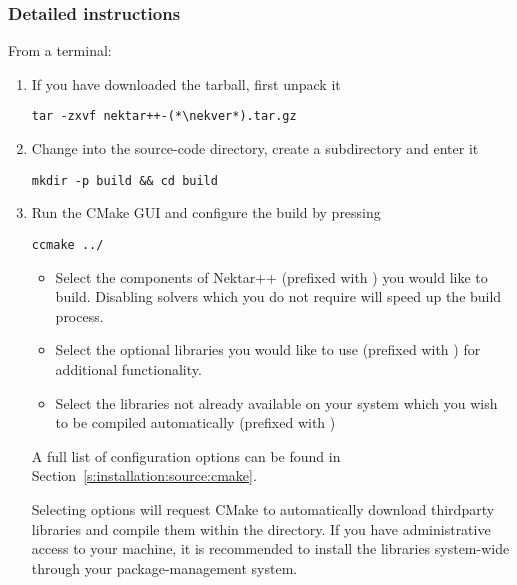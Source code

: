 \subsubsection{Detailed instructions}
From a terminal:
\begin{enumerate}
    \item If you have downloaded the tarball, first unpack it
    \begin{lstlisting}[style=BashInputStyle]
tar -zxvf nektar++-(*\nekver*).tar.gz
    \end{lstlisting}
    
    \item Change into the source-code directory, create a 
    subdirectory and enter it 
    \begin{lstlisting}[style=BashInputStyle]
    mkdir -p build && cd build
    \end{lstlisting}
    
    \item Run the CMake GUI and configure the build by pressing 
    \begin{lstlisting}[style=BashInputStyle]
    ccmake ../
    \end{lstlisting}
    \begin{itemize}
        \item Select the components of Nektar++ (prefixed with
        ) you would like to build. Disabling solvers
        which you do not require will speed up the build process.
        \item Select the optional libraries you would like to use (prefixed with
        ) for additional functionality.
        \item Select the libraries not already available on your system which
        you wish to be compiled automatically (prefixed with 
        )
    \end{itemize}
    A full list of configuration options can be found in
    Section~\ref{s:installation:source:cmake}.

    \begin{notebox}
    Selecting  options will request CMake to
    automatically download thirdparty libraries and compile them within the
    \nekpp directory. If you have administrative access to your machine, it is
    recommended to install the libraries system-wide through your
    package-management system.
    \end{notebox}
    

\end{enumerate}
